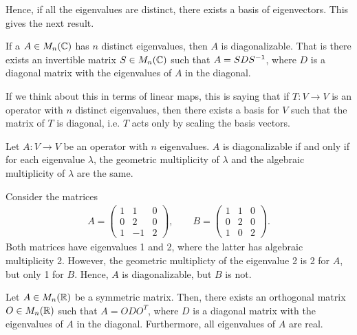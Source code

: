 \documentclass{article}
\begin{document}
Hence, if all the eigenvalues are distinct, there exists a basis of eigenvectors. This gives the next result. 

\begin{corollary}
If a $A\in M_n({\mathbb{C}})$ has $n$ distinct eigenvalues, then $A$ is diagonalizable. That is there exists an invertible matrix $S\in M_n({\mathbb{C}})$ such that $A = SDS^{-1}$, where $D$ is a diagonal matrix with the eigenvalues of $A$ in the diagonal.
\end{corollary}

If we think about this in terms of linear maps, this is saying that if $T:V \to V$ is an operator with $n$ distinct eigenvalues, then there exists a basis for $V$ such that the matrix of $T$ is diagonal, i.e. $T$ acts only by scaling the basis vectors.

\begin{theorem}
Let $A:V\to V$ be an operator with $n$ eigenvalues. $A$ is diagonalizable if and only if for each eigenvalue $\lambda$, the geometric multiplicity of $\lambda$ and the algebraic multiplicity of $\lambda$ are the same.
\end{theorem}

\begin{example}
Consider the matrices 
\begin{align*}
    A = \begin{pmatrix}
        1&1&0 \\ 0 &2 &0 \\ 1 & -1 & 2
    \end{pmatrix}, \qquad 
    B = \begin{pmatrix}
        1&1&0 \\ 0 &2 &0 \\ 1 & 0 & 2
    \end{pmatrix}.
\end{align*}
Both matrices have eigenvalues 1 and 2, where the latter has algebraic multiplicity 2. However, the geometric multiplicty of the eigenvalue 2 is 2 for $A$, but only 1 for $B$. Hence, $A$ is diagonalizable, but $B$ is not. 
\end{example}


\begin{theorem}
\label{thm:symmetric_orthogonallydiag}
Let $A\in M_n({\mathbb{R}})$ be a symmetric matrix. Then, there exists an orthogonal matrix $O\in M_n({\mathbb{R}})$ such that $A=ODO^T$, where $D$ is a diagonal matrix with the eigenvalues of $A$ in the diagonal. Furthermore, all eigenvalues of $A$ are real.
\end{theorem}
\end{document}
